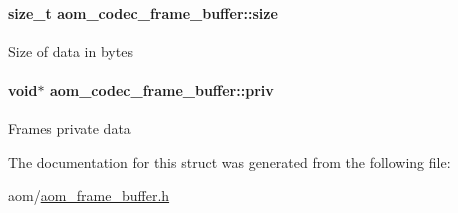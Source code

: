 \paragraph[{\texorpdfstring{size}{size}}]{\setlength{\rightskip}{0pt plus 5cm}size\+\_\+t aom\+\_\+codec\+\_\+frame\+\_\+buffer\+::size}\hypertarget{structaom__codec__frame__buffer_a6fc24049c4e1706ce3a462825009f3d4}{}\label{structaom__codec__frame__buffer_a6fc24049c4e1706ce3a462825009f3d4}
Size of data in bytes 
\paragraph[{\texorpdfstring{priv}{priv}}]{\setlength{\rightskip}{0pt plus 5cm}void$\ast$ aom\+\_\+codec\+\_\+frame\+\_\+buffer\+::priv}\hypertarget{structaom__codec__frame__buffer_aa689f8e27421eebc9e1c70b607e415ef}{}\label{structaom__codec__frame__buffer_aa689f8e27421eebc9e1c70b607e415ef}
Frame\textquotesingle{}s private data 

The documentation for this struct was generated from the following file\+:\begin{DoxyCompactItemize}
\item 
aom/\hyperlink{aom__frame__buffer_8h}{aom\+\_\+frame\+\_\+buffer.\+h}\end{DoxyCompactItemize}
